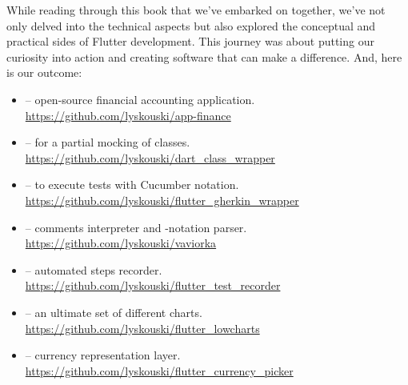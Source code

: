 
While reading through this book that we've embarked on together, we've not only delved into the technical aspects but 
also explored the conceptual and practical sides of Flutter development. This journey was about putting our curiosity 
into action and creating software that can make a difference. And, here is our outcome:

\begin{itemize}
\item {} -- open-source financial accounting application.\\
\href{https://github.com/lyskouski/app-finance}{https://github.com/lyskouski/app-finance}

\item {} -- for a partial mocking of classes.\\
\href{https://github.com/lyskouski/dart\_class\_wrapper}{https://github.com/lyskouski/dart\_class\_wrapper}

\item {} -- to execute tests with Cucumber notation.\\
\href{https://github.com/lyskouski/flutter\_gherkin\_wrapper}{https://github.com/lyskouski/flutter\_gherkin\_wrapper}

\item {} --  comments interpreter and -notation parser.\\
\href{https://github.com/lyskouski/vaviorka}{https://github.com/lyskouski/vaviorka}

\item {} -- automated steps recorder.\\
\href{https://github.com/lyskouski/flutter\_test\_recorder}{https://github.com/lyskouski/flutter\_test\_recorder}

\item {} -- an ultimate set of different charts.\\
\href{https://github.com/lyskouski/flutter\_lowcharts}{https://github.com/lyskouski/flutter\_lowcharts}

\item {} -- currency representation layer.\\
\href{https://github.com/lyskouski/flutter\_currency\_picker}{https://github.com/lyskouski/flutter\_currency\_picker}


\end{itemize}
